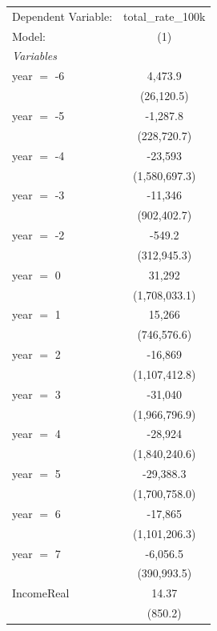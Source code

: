
\begingroup
\centering
\begin{tabular}{lc}
   \tabularnewline \midrule \midrule
   Dependent Variable: & total\_rate\_100k\\    
   Model:              & (1)\\  
   \midrule
   \emph{Variables}\\
   year $=$ -6         & 4,473.9\\   
                       & (26,120.5)\\   
   year $=$ -5         & -1,287.8\\   
                       & (228,720.7)\\   
   year $=$ -4         & -23,593\\   
                       & (1,580,697.3)\\   
   year $=$ -3         & -11,346\\   
                       & (902,402.7)\\   
   year $=$ -2         & -549.2\\   
                       & (312,945.3)\\   
   year $=$ 0          & 31,292\\   
                       & (1,708,033.1)\\   
   year $=$ 1          & 15,266\\   
                       & (746,576.6)\\   
   year $=$ 2          & -16,869\\   
                       & (1,107,412.8)\\   
   year $=$ 3          & -31,040\\   
                       & (1,966,796.9)\\   
   year $=$ 4          & -28,924\\   
                       & (1,840,240.6)\\   
   year $=$ 5          & -29,388.3\\   
                       & (1,700,758.0)\\   
   year $=$ 6          & -17,865\\   
                       & (1,101,206.3)\\   
   year $=$ 7          & -6,056.5\\   
                       & (390,993.5)\\   
   IncomeReal          & 14.37\\   
                       & (850.2)\\   

\end{tabular}
